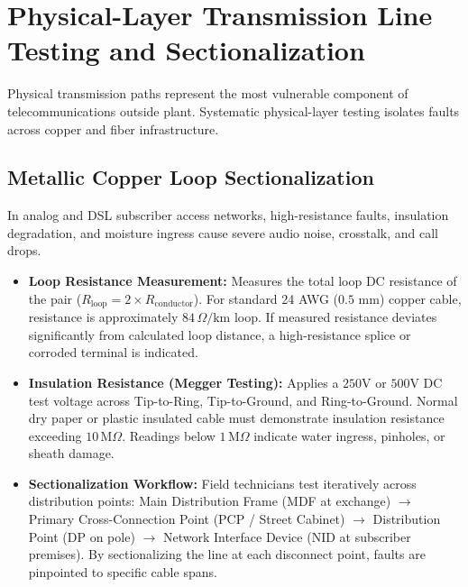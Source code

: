 \documentclass[12pt,a4paper]{report}
\begin{document}
\section{Physical-Layer Transmission Line Testing and Sectionalization}
Physical transmission paths represent the most vulnerable component of telecommunications outside plant. Systematic physical-layer testing isolates faults across copper and fiber infrastructure.

\subsection{Metallic Copper Loop Sectionalization}
In analog and DSL subscriber access networks, high-resistance faults, insulation degradation, and moisture ingress cause severe audio noise, crosstalk, and call drops.
\begin{itemize}
    \item \textbf{Loop Resistance Measurement:} Measures the total loop DC resistance of the pair ($R_{\text{loop}} = 2 \times R_{\text{conductor}}$). For standard 24 AWG ($0.5\text{ mm}$) copper cable, resistance is approximately $84\,\Omega/\text{km}$ loop. If measured resistance deviates significantly from calculated loop distance, a high-resistance splice or corroded terminal is indicated.
    
    \item \textbf{Insulation Resistance (Megger Testing):} Applies a $250\text{V}$ or $500\text{V DC}$ test voltage across Tip-to-Ring, Tip-to-Ground, and Ring-to-Ground. Normal dry paper or plastic insulated cable must demonstrate insulation resistance exceeding $10\,\text{M}\Omega$. Readings below $1\,\text{M}\Omega$ indicate water ingress, pinholes, or sheath damage.
    
    \item \textbf{Sectionalization Workflow:} Field technicians test iteratively across distribution points: Main Distribution Frame (MDF at exchange) $\rightarrow$ Primary Cross-Connection Point (PCP / Street Cabinet) $\rightarrow$ Distribution Point (DP on pole) $\rightarrow$ Network Interface Device (NID at subscriber premises). By sectionalizing the line at each disconnect point, faults are pinpointed to specific cable spans.
\end{itemize}
\end{document}
